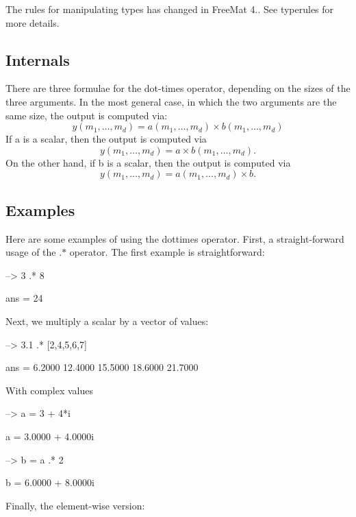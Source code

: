 The rules for manipulating types has changed in Free\-Mat 4.. See {\ttfamily typerules} for more details.\hypertarget{transforms_svd_Function}{}\subsection{Internals}\label{transforms_svd_Function}
There are three formulae for the dot-\/times operator, depending on the sizes of the three arguments. In the most general case, in which the two arguments are the same size, the output is computed via\-: \[ y(m_1,\ldots,m_d) = a(m_1,\ldots,m_d) \times b(m_1,\ldots,m_d) \] If {\ttfamily a} is a scalar, then the output is computed via \[ y(m_1,\ldots,m_d) = a \times b(m_1,\ldots,m_d). \] On the other hand, if {\ttfamily b} is a scalar, then the output is computed via \[ y(m_1,\ldots,m_d) = a(m_1,\ldots,m_d) \times b. \] \hypertarget{variables_matrix_Examples}{}\subsection{Examples}\label{variables_matrix_Examples}
Here are some examples of using the dottimes operator. First, a straight-\/forward usage of the {\ttfamily .$\ast$} operator. The first example is straightforward\-:


\begin{DoxyVerbInclude}
--> 3 .* 8

ans = 
 24 
\end{DoxyVerbInclude}


Next, we multiply a scalar by a vector of values\-:


\begin{DoxyVerbInclude}
--> 3.1 .* [2,4,5,6,7]

ans = 
    6.2000   12.4000   15.5000   18.6000   21.7000 
\end{DoxyVerbInclude}


With complex values


\begin{DoxyVerbInclude}
--> a = 3 + 4*i

a = 
   3.0000 +  4.0000i 

--> b = a .* 2

b = 
   6.0000 +  8.0000i 
\end{DoxyVerbInclude}


Finally, the element-\/wise version\-:


